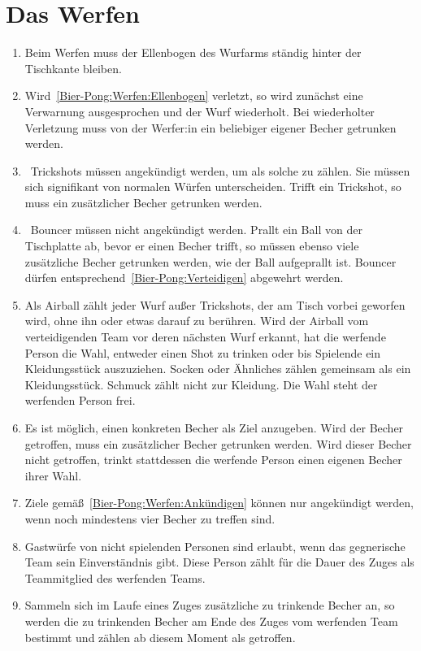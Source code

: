 \section{Das Werfen}
\begin{enumerate}[label={(\arabic*)}]
    \item\label{Bier-Pong:Werfen:Ellenbogen}
    Beim Werfen muss der Ellenbogen des Wurfarms ständig hinter der Tischkante bleiben.

    \item
    Wird~\ref{Bier-Pong:Werfen:Ellenbogen} verletzt, so wird zunächst eine Verwarnung ausgesprochen und der Wurf wiederholt.
    Bei wiederholter Verletzung muss von der Werfer:in ein beliebiger eigener Becher getrunken werden.

    \item
~\glqq{}Trickshots\grqq{} müssen angekündigt werden, um als solche zu zählen.
    Sie müssen sich signifikant von normalen Würfen unterscheiden.
    Trifft ein Trickshot, so muss ein zusätzlicher Becher getrunken werden.

    \item
~\glqq{}Bouncer\grqq{} müssen nicht angekündigt werden.
    Prallt ein Ball von der Tischplatte ab, bevor er einen Becher trifft, so müssen ebenso viele zusätzliche Becher getrunken werden, wie der Ball aufgeprallt ist.
    Bouncer dürfen entsprechend~\ref{Bier-Pong:Verteidigen} abgewehrt werden.

    \item
    Als \glqq{}Airball\grqq{} zählt jeder Wurf außer Trickshots, der am Tisch vorbei geworfen wird, ohne ihn oder etwas darauf zu berühren.
    Wird der Airball vom verteidigenden Team vor deren nächsten Wurf erkannt, hat die werfende Person die Wahl, entweder einen Shot zu trinken oder bis Spielende ein Kleidungsstück auszuziehen.
    Socken oder Ähnliches zählen gemeinsam als ein Kleidungsstück.
    Schmuck zählt nicht zur Kleidung.
    Die Wahl steht der werfenden Person frei.

    \item\label{Bier-Pong:Werfen:Ankündigen}
    Es ist möglich, einen konkreten Becher als Ziel anzugeben.
    Wird der Becher getroffen, muss ein zusätzlicher Becher getrunken werden.
    Wird dieser Becher nicht getroffen, trinkt stattdessen die werfende Person einen eigenen Becher ihrer Wahl.

    \item
    Ziele gemäß~\ref{Bier-Pong:Werfen:Ankündigen} können nur angekündigt werden, wenn noch mindestens vier Becher zu treffen sind.

    \item
    Gastwürfe von nicht spielenden Personen sind erlaubt, wenn das gegnerische Team sein Einverständnis gibt.
    Diese Person zählt für die Dauer des Zuges als Teammitglied des werfenden Teams.

    \item
    Sammeln sich im Laufe eines Zuges zusätzliche zu trinkende Becher an, so werden die zu trinkenden Becher am Ende des Zuges vom werfenden Team bestimmt und zählen ab diesem Moment als getroffen.
\end{enumerate}

